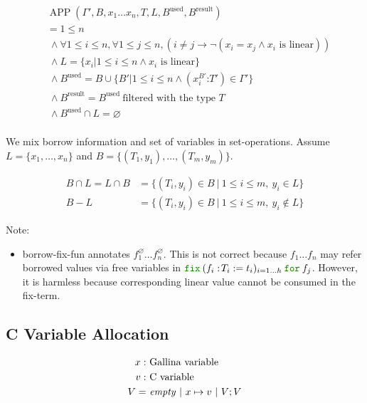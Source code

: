\documentclass[a4paper,fleqn]{article}
\def\gallina{\textrm{Gallina}}
\newcommand{\kwfix}{\mbox{\color{mygreen}\ttfamily fix}}
\newcommand{\kwfor}{\mbox{\color{mygreen}\ttfamily for}}
\newcommand{\lassum}[2]{(#1\mathord{:}#2)}
\newcommand{\fixT}[5]{\kwfix\:(#1:\!#2 := #3)_{#4}\:\kwfor\:#5}
\DeclareMathOperator{\APP}{APP}
\begin{document}
\begin{align*}
  &\APP(\Gamma', B, x_1 \ldots x_n, T, L, B^\text{used}, B^\text{result}) \\
  &= 1 \leq n \\
  &~\wedge \forall 1 \leq i \leq n, \forall 1 \leq j \leq n, (i \neq j \rightarrow \neg (x_i = x_j \wedge \text{$x_i$ is linear})) \\
  &~\wedge L = \{ x_i | 1 \leq i \leq n \wedge \text{$x_i$ is linear} \} \\
  &~\wedge B^\text{used} = B \cup \{ B' | 1 \leq i \leq n \wedge \lassum{x_i^{B'}}{T'} \in \Gamma' \} \\
  &~\wedge B^\text{result} = B^\text{used} ~\text{filtered with the type $T$} \\
  &~\wedge B^\text{used} \cap L = \varnothing \\
\end{align*}

We mix borrow information and set of variables in set-operations.
Assume $L=\{x_1,\ldots,x_n\}$ and $B=\{(T_1,y_1),\ldots,(T_m,y_m)\}$.

\begin{align*}
  B \cap L = L \cap B &= \{(T_i,y_i) \in B ~|~ 1\leq i\leq m,~ y_i \in L \} \\
  B - L &= \{(T_i,y_i) \in B ~|~ 1\leq i\leq m,~ y_i \not\in L \}
\end{align*}

{\small Note:
\begin{itemize}
  \item borrow-fix-fun annotates $f_1^\varnothing \ldots f_n^\varnothing$.
    This is not correct because $f_1\ldots f_n$ may refer borrowed values via free variables in
    $\fixT{f_i}{T_i}{t_i}{i=1\ldots h}{f_j}$.
    However, it is harmless because corresponding linear value cannot be consumed in the fix-term.
\end{itemize}}

\subsection{C Variable Allocation}\label{sec:cvaralloc}

\begin{align*}
  x :&\ \mbox{\gallina{} variable} \\
  v :&\ \mbox{C variable} \\
  V =&\ \mathit{empty} ~|~ x \mapsto v ~|~ V;V
\end{align*}
\end{document}
